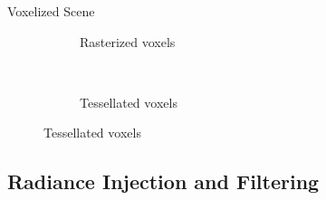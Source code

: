 \documentclass[10pt]{beamer}
\begin{document}
\begin{frame}{Voxelized Scene}

  \begin{figure}
    \begin{subfigure}[t]{0.475\textwidth}
      \caption*{Rasterized voxels}
    \end{subfigure}
    ~
    \begin{subfigure}[t]{0.475\textwidth}
      \caption*{Tessellated voxels}
    \end{subfigure}
  \end{figure}
\end{frame}

\subsection{Radiance Injection and Filtering}
\end{document}
